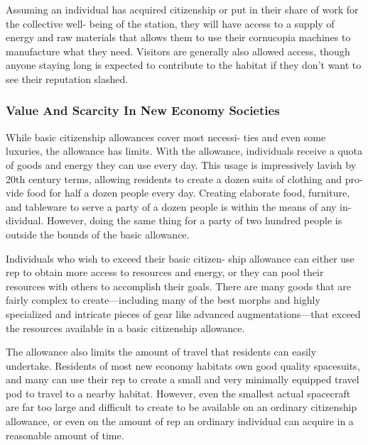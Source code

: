 Assuming an individual has acquired citizenship 
or put in their share of work for the collective well-
being of the station, they will have access to a supply 
of energy and raw materials that allows them to use 
their cornucopia machines to manufacture what they 
need. Visitors are generally also allowed access, though 
anyone staying long is expected to contribute to the 
habitat if they don't want to see their reputation slashed.

\subsubsection{Value And Scarcity In New Economy Societies}

While basic citizenship allowances cover most necessi-
ties and even some luxuries, the allowance has limits. 
With the allowance, individuals receive a quota of 
goods and energy they can use every day. This usage 
is impressively lavish by 20th century terms, allowing 
residents to create a dozen suits of clothing and pro-
vide food for half a dozen people every day. Creating 
elaborate food, furniture, and tableware to serve a 
party of a dozen people is within the means of any in-
dividual. However, doing the same thing for a party of 
two hundred people is outside the bounds of the basic 
allowance.

Individuals who wish to exceed their basic citizen-
ship allowance can either use rep to obtain more 
access to resources and energy, or they can pool 
their resources with others to accomplish their goals. 
There are many goods that are fairly complex to 
create—including many of the best morphs and highly 
specialized and intricate pieces of gear like advanced 
augmentations—that exceed the resources available in 
a basic citizenship allowance.

The allowance also limits the amount of travel that 
residents can easily undertake. Residents of most new 
economy habitats own good quality spacesuits, and 
many can use their rep to create a small and very 
minimally equipped travel pod to travel to a nearby 
habitat. However, even the smallest actual spacecraft 
are far too large and difficult to create to be available 
on an ordinary citizenship allowance, or even on the 
amount of rep an ordinary individual can acquire in a 
reasonable amount of time.

